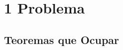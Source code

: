\documentclass[12pt, fleqn]{article}                             %
\theoremstyle{break}                                            %
\begin{document}
\restoregeometry                                                    %
\nopagecolor                                                        %




\tableofcontents{}
\label{sec:Index}

\clearpage




\clearpage
\section{1 Problema}



    \clearpage
    \subsection{Teoremas que Ocupar}
\end{document}

